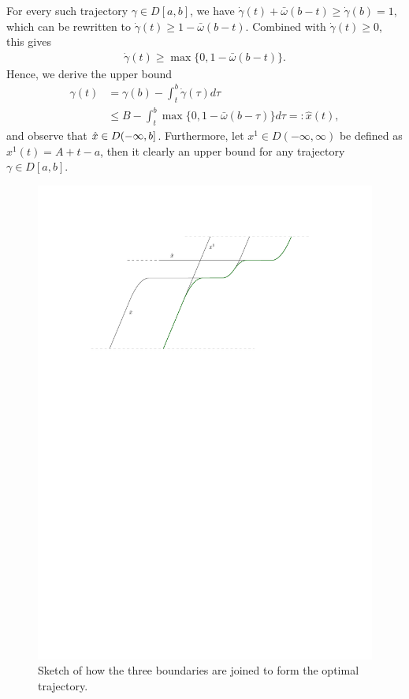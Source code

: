 \documentclass[a4paper]{article}
\theoremstyle{definition}
\theoremstyle{plain}
\begin{document}
For every such trajectory $\gamma \in D[a,b]$, we have
$\dot{\gamma}(t) + \bar{\omega} (b - t) \geq \dot{\gamma}(b) = 1$, which can be
rewritten to $\dot{\gamma}(t) \geq 1 - \bar{\omega} (b - t)$. Combined with
$\dot{\gamma}(t) \geq 0$, this gives
\begin{align}
  \dot{\gamma}(t) \geq \max \{ 0, 1 - \bar{\omega}(b - t) \} .
\end{align}
Hence, we derive the upper bound
\begin{subequations}
\begin{align}
  \gamma(t) &= \gamma(b) - \int_{t}^{b} \dot{\gamma}(\tau) d \tau \\
  &\leq B - \int_{t}^{b} \max\{ 0, 1 -\bar{\omega} (b - \tau) \} d \tau =: \hat{x}(t),
\end{align}
\end{subequations}
and observe that $\hat{x} \in D(-\infty,b]$.
%
Furthermore, let $x^{1} \in D(-\infty, \infty)$ be defined as
$x^{1}(t) = A + t - a$, then it clearly an upper bound for any trajectory
$\gamma \in D[a, b]$.


\begin{figure}
  \centering
  \includegraphics[scale=1]{figures/motion/rough/proof}
  \caption{Sketch of how the three boundaries are joined to form the
    optimal trajectory.}%
  \label{fig:theorem-proof}
\end{figure}
\end{document}
